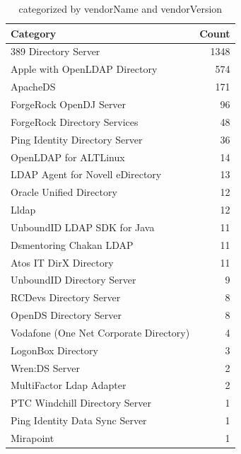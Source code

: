 \begin{table}[htbp]
\centering
\begin{tabular}{l r}
\toprule
\textbf{Category} & \textbf{Count} \\
\midrule
\midrule
389 Directory Server & 1348 \\
Apple with OpenLDAP Directory & 574 \\
ApacheDS & 171 \\
ForgeRock OpenDJ Server & 96 \\
ForgeRock Directory Services & 48 \\
Ping Identity Directory Server & 36 \\
OpenLDAP for ALTLinux & 14 \\
LDAP Agent for Novell eDirectory & 13 \\
Oracle Unified Directory & 12 \\
Lldap & 12 \\
UnboundID LDAP SDK for Java & 11 \\
Dsmentoring Chakan LDAP & 11 \\
Atos IT DirX Directory & 11 \\
UnboundID Directory Server & 9 \\
RCDevs Directory Server & 8 \\
OpenDS Directory Server & 8 \\
Vodafone (One Net Corporate Directory) & 4 \\
LogonBox Directory & 3 \\
Wren:DS Server & 2 \\
MultiFactor Ldap Adapter & 2 \\
PTC Windchill Directory Server & 1 \\
Ping Identity Data Sync Server & 1 \\
Mirapoint & 1 \\
\bottomrule
\end{tabular}
\caption{categorized by vendorName and vendorVersion}
\label{tab:CatByNameAndVersion}
\end{table}
